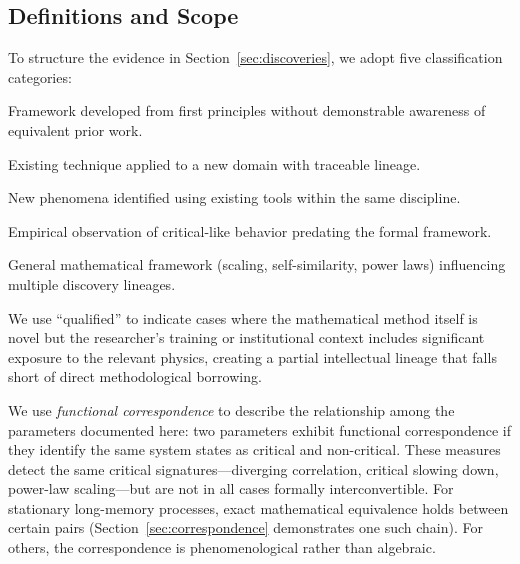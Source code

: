 \documentclass[11pt]{article}
\begin{document}
\subsection{Definitions and Scope}
\label{sec:definitions}

To structure the evidence in Section~\ref{sec:discoveries}, we adopt five classification categories:

\begin{description}[nosep,leftmargin=1em,labelindent=0em]
\item[Independent derivation:] Framework developed from first principles without demonstrable awareness of equivalent prior work.
\item[Domain transfer:] Existing technique applied to a new domain with traceable lineage.
\item[Intra-field extension:] New phenomena identified using existing tools within the same discipline.
\item[Empirical precursor:] Empirical observation of critical-like behavior predating the formal framework.
\item[Foundational cross-domain contribution:] General mathematical framework (scaling, self-similarity, power laws) influencing multiple discovery lineages.
\end{description}

\noindent We use ``qualified'' to indicate cases where the mathematical method itself is novel but the researcher's training or institutional context includes significant exposure to the relevant physics, creating a partial intellectual lineage that falls short of direct methodological borrowing.

We use \textit{functional correspondence} to describe the relationship among the parameters documented here: two parameters exhibit functional correspondence if they identify the same system states as critical and non-critical. These measures detect the same critical signatures---diverging correlation, critical slowing down, power-law scaling---but are not in all cases formally interconvertible. For stationary long-memory processes, exact mathematical equivalence holds between certain pairs (Section~\ref{sec:correspondence} demonstrates one such chain). For others, the correspondence is phenomenological rather than algebraic.
\end{document}
